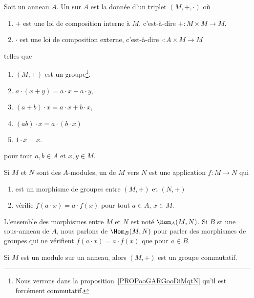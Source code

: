 \begin{definition}       \label{DEFooHXITooBFvzrR}
    Soit un anneau \( A\). Un  sur \( A\) est la donnée d'un triplet \( (M,+,\cdot)\) où
    \begin{enumerate}
        \item
            \( +\) est une loi de composition interne à \( M\), c'est-à-dire \( +\colon M\times M\to M\),
        \item
            \( \cdot\) est une loi de composition externe, c'est-à-dire \( \cdot\colon A\times M\to M\)
    \end{enumerate}
    telles que
    \begin{enumerate}
        \item
            \( (M,+)\) est un groupe\footnote{Nous verrons dans la proposition~\ref{PROPooGARGooDiMqtN} qu'il est forcément commutatif.}.
        \item
            \( a\cdot(x+y)=a\cdot x+a\cdot y\),
        \item
            \( (a+b)\cdot x=a\cdot x+b\cdot x\),
        \item
            \( (ab)\cdot x=a\cdot(b\cdot x)\)
        \item
            \( 1\cdot x=x\).
    \end{enumerate}
    pour tout \( a,b\in A\) et \( x,y\in M\).

    Si \( M\) et \( N\) sont des \( A\)-modules, un  de \( M\) vers \( N\) est une application \( f\colon M\to N\) qui 
    \begin{enumerate}
        \item
            est un morphisme de groupes entre \( (M,+)\) et \( (N,+)\) 
        \item
            vérifie \( f(a\cdot x)=a\cdot f(x)\) pour tout \( a\in A\), \( x\in M\).
    \end{enumerate}
    L'ensemble des morphismes entre \( M\) et \( N\) est noté \( \Hom_A(M,N)\). Si \( B\) st une sous-anneau de \( A\),  nous parlons de \( \Hom_B(M,N)\) pour parler des morphismes de groupes qui ne vérifient \( f(a\cdot x)=a\cdot f(x)\) que pour \( a\in B\).
\end{definition}

\begin{proposition}\label{PROPooGARGooDiMqtN}
    Si \( M\) est un module sur un anneau, alors \( (M,+)\) est un groupe commutatif.
\end{proposition}

